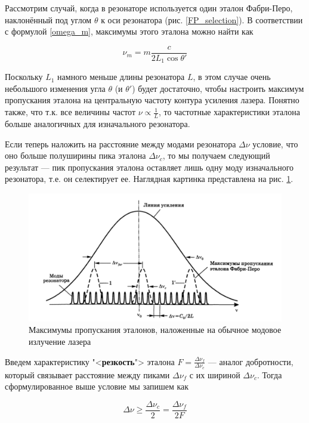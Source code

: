 \documentclass[12pt]{kiarticle}
\begin{document}
Рассмотрим случай, когда в резонаторе используется один эталон Фабри-Перо, наклонённый под углом $ \theta $ к оси резонатора (рис. \ref{FP_selection}). В соответствии с формулой \eqref{omega_m}, максимумы этого эталона можно найти как 

\begin{equation}\label{}
\nu_m = m \dfrac{c}{2L_1 \cos \theta'}
\end{equation}

Поскольку $ L_1 $ намного меньше длины резонатора $ L $, в этом случае очень небольшого изменения угла $ \theta $ (и $ \theta' $) будет достаточно, чтобы настроить максимум пропускания эталона на центральную частоту контура усиления лазера. Понятно также, что т.к. все величины частот $ \nu \propto \frac{1}{L} $, то частотные характеристики эталона больше аналогичных для изначального резонатора. 

Если теперь наложить на расстояние между модами резонатора $ \Delta \nu $ условие, что оно больше полуширины пика эталона $ \Delta \nu_c $, то мы получаем следующий результат --- пик пропускания эталона оставляет лишь одну моду изначального резонатора, т.е. он селектирует ее. Наглядная картинка представлена на рис. \ref{selection}. 

\begin{figure}[h!]
 	\centering
 	\includegraphics[width=0.7\linewidth]{selection}
 	\caption{{\small Максимумы пропускания эталонов, наложенные на обычное модовое излучение лазера}}
 	\label{selection}
\end{figure}

Введем характеристику "<\textbf{резкость}"> эталона $ F = \frac{\Delta \nu_f}{\Delta \nu_c} $ --- аналог добротности, который связывает расстояние между пиками $ \Delta \nu_f $ с их шириной $ \Delta \nu_c $. Тогда сформулированное выше условие мы запишем как

\begin{equation}\label{delta nu > delta nu_c/2}
\Delta \nu \geq \dfrac{\Delta \nu_c}{2} = \dfrac{\Delta \nu_f}{2F}
\end{equation}
\end{document}
